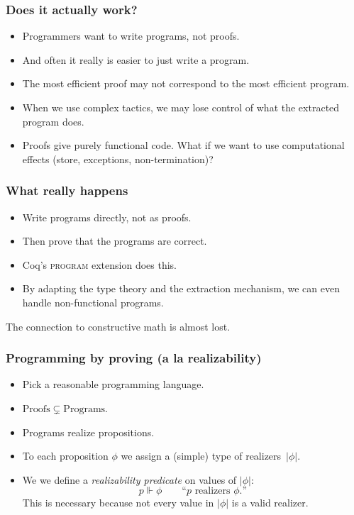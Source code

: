 \documentclass[t]{beamer}
\newcommand{\rz}{\Vdash}
\begin{document}
\begin{frame}
  \frametitle{Does it actually work?}

  \begin{itemize}
  \item Programmers want to write programs, not proofs.
  \item And often it really is easier to just write a program.
  \item The most efficient proof may not correspond to the most
    efficient program.
  \item When we use complex tactics, we may lose control of what the
    extracted program does.
  \item Proofs give purely functional code. What if we want to use
    computational effects (store, exceptions, non-termination)?
  \end{itemize}

\end{frame}

\begin{frame}
  \frametitle{What really happens}

  \begin{itemize}
  \item Write programs directly, not as proofs.
  \item Then prove that the programs are correct.
  \item Coq's \textsc{program} extension does this.
  \item By adapting the type theory and the extraction mechanism, we
    can even handle non-functional programs.
  \end{itemize}

  \pause

  The connection to constructive math is almost lost.

\end{frame}

\begin{frame}
  \frametitle{Programming by proving (a la realizability)}

  \begin{itemize}
  \item Pick a reasonable programming language.
  \item $\mathrm{Proofs} \subsetneq \mathrm{Programs}$.
  \item Programs realize propositions.
  \item To each proposition $\phi$ we assign a (simple) type of
    realizers~$|\phi|$.
  \item We we define a \emph{realizability predicate} on values of $|\phi|$:
    \begin{equation*}
      p \rz \phi \qquad \text{``$p$ realizers $\phi$.''}
    \end{equation*}
    This is necessary because not every value in $|\phi|$ is a valid
    realizer.
  \end{itemize}
\end{frame}
\end{document}
